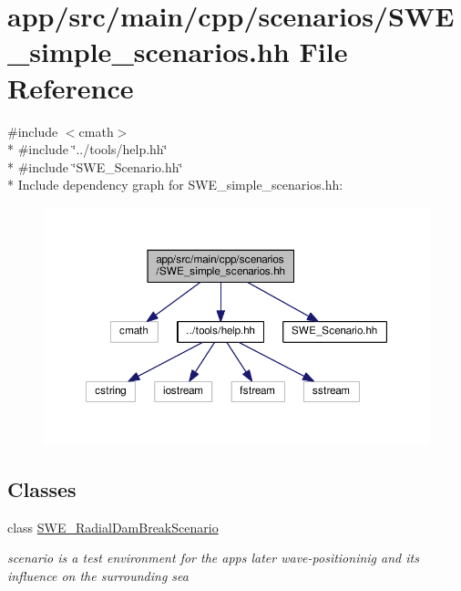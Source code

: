 \hypertarget{SWE__simple__scenarios_8hh}{}\section{app/src/main/cpp/scenarios/\+S\+W\+E\+\_\+simple\+\_\+scenarios.hh File Reference}
\label{SWE__simple__scenarios_8hh}
{\ttfamily \#include $<$cmath$>$}\\*
{\ttfamily \#include \char`\"{}../tools/help.\+hh\char`\"{}}\\*
{\ttfamily \#include \char`\"{}S\+W\+E\+\_\+\+Scenario.\+hh\char`\"{}}\\*
Include dependency graph for S\+W\+E\+\_\+simple\+\_\+scenarios.\+hh\+:\nopagebreak
\begin{figure}[H]
\begin{center}
\leavevmode
\includegraphics[width=350pt]{SWE__simple__scenarios_8hh__incl}
\end{center}
\end{figure}
\subsection*{Classes}
\begin{DoxyCompactItemize}
\item 
class \hyperlink{classSWE__RadialDamBreakScenario}{S\+W\+E\+\_\+\+Radial\+Dam\+Break\+Scenario}
\begin{DoxyCompactList}\small\item\em scenario is a test environment for the apps later wave-\/positioninig and its influence on the surrounding sea \end{DoxyCompactList}\end{DoxyCompactItemize}


